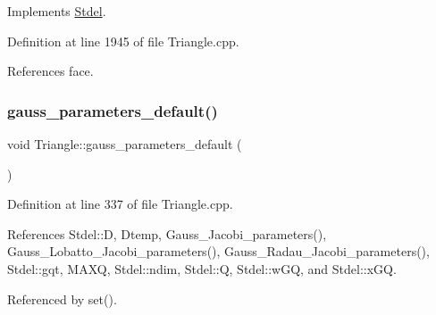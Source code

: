 Implements \hyperlink{classStdel_a0df3b2fe6d87c6d0067d07ac2a2d3a32}{Stdel}.



Definition at line 1945 of file Triangle.\+cpp.



References face.

\mbox{\label{classTriangle_a37e1fe2af0b509986126c978e9dbbe76}} 
\subsubsection{\texorpdfstring{gauss\+\_\+parameters\+\_\+default()}{gauss\_parameters\_default()}}
{\footnotesize\ttfamily void Triangle\+::gauss\+\_\+parameters\+\_\+default (\begin{DoxyParamCaption}{ }\end{DoxyParamCaption})\hspace{0.3cm}{\ttfamily [private]}}



Definition at line 337 of file Triangle.\+cpp.



References Stdel\+::D, Dtemp, Gauss\+\_\+\+Jacobi\+\_\+parameters(), Gauss\+\_\+\+Lobatto\+\_\+\+Jacobi\+\_\+parameters(), Gauss\+\_\+\+Radau\+\_\+\+Jacobi\+\_\+parameters(), Stdel\+::gqt, M\+A\+XQ, Stdel\+::ndim, Stdel\+::Q, Stdel\+::w\+GQ, and Stdel\+::x\+GQ.



Referenced by set().

